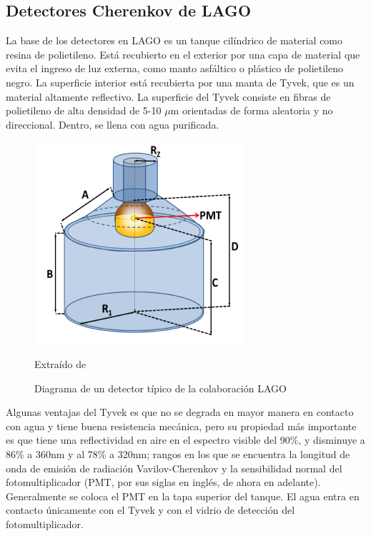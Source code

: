 \documentclass{book}
\begin{document}
\subsection{Detectores Cherenkov de LAGO}

La base de los detectores en LAGO es un tanque cil\'indrico de material como resina de polietileno. Est\'a recubierto en el exterior por una capa de material que evita el ingreso de luz externa, como manto asf\'altico o pl\'astico de polietileno negro. La superficie interior est\'a recubierta por una manta de Tyvek, que es un material altamente reflectivo. La superficie del Tyvek consiste en fibras de polietileno de alta densidad de 5-10 $\mu$m orientadas de forma aleatoria y no direccional. Dentro, se llena con agua purificada. \citep{PEREZ} \citep{DUPONT}

\begin{figure}[ht] %
\begin{center}
 \includegraphics[width = 0.5\linewidth]{DetectorLAGO.png}
 
 Extra\'ido de \citep{PEREZ}
\caption{Diagrama de un detector t\'ipico de la colaboraci\'on LAGO}
\end{center}
\end{figure}

Algunas ventajas del Tyvek es que no se degrada en mayor manera en contacto con agua y tiene buena resistencia mec\'anica, pero su propiedad m\'as importante es que tiene una reflectividad en aire en el espectro visible del 90\%, y disminuye a 86\% a 360nm y al 78\% a 320nm; rangos en los que se encuentra la longitud de onda de emisi\'on de radiaci\'on Vavilov-Cherenkov y la sensibilidad normal del fotomultiplicador (PMT, por sus siglas en ingl\'es, de ahora en adelante). Generalmente se coloca el PMT en la tapa superior del tanque. El agua entra en contacto \'unicamente con el Tyvek y con el vidrio de detecci\'on del fotomultiplicador. \citep{PEREZ}
\end{document}
